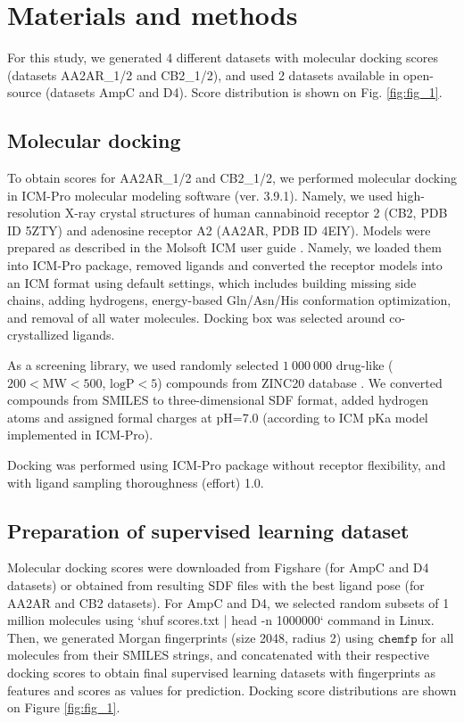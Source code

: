 \section{Materials and methods}
For this study, we generated 4 different datasets with molecular docking scores (datasets AA2AR\_1/2 and CB2\_1/2), and used 2 datasets available in open-source \cite{ultralarge_docking_first} (datasets AmpC and D4). Score distribution is shown on Fig. \ref{fig:fig_1}.

\subsection{Molecular docking}
To obtain scores for AA2AR\_1/2 and CB2\_1/2, we performed molecular docking in ICM-Pro molecular modeling software (ver. 3.9.1). Namely, we used high-resolution X-ray crystal structures of human cannabinoid receptor 2 (CB2, PDB ID 5ZTY) and adenosine receptor A2 (AA2AR, PDB ID 4EIY). Models were prepared as described in the Molsoft ICM user guide \cite{molsoft_guide}. Namely, we loaded them into ICM-Pro package, removed ligands and converted the receptor models into an ICM format using default settings, which includes building missing side chains, adding hydrogens, energy-based Gln/Asn/His conformation optimization, and removal of all water molecules. Docking box was selected around co-crystallized ligands.

As a screening library, we used randomly selected $1\ 000\ 000$ drug-like ($200 < \text{MW} < 500$, $\text{logP} < 5$) compounds from ZINC20 database \cite{Irwin2020ZINC20Discovery} . We converted compounds from SMILES to three-dimensional SDF  format, added hydrogen atoms and assigned formal charges at pH=7.0 (according to ICM pKa model implemented in ICM-Pro).

Docking was performed using ICM-Pro package without receptor flexibility, and with ligand sampling thoroughness (effort) 1.0.

\subsection{Preparation of supervised learning dataset}
Molecular docking scores were downloaded from Figshare (for AmpC and D4 datasets) or obtained from resulting SDF files with the best ligand pose (for AA2AR and CB2 datasets). For AmpC and D4, we selected random subsets of 1 million molecules using `shuf scores.txt | head -n 1000000` command in Linux. Then, we generated Morgan fingerprints (size 2048, radius 2) using $\texttt{chemfp}$ \cite{Dalke2019} for all molecules from their SMILES strings, and concatenated with their respective docking scores to obtain final supervised learning datasets with fingerprints as features and scores as values for prediction. Docking score distributions are shown on Figure \ref{fig:fig_1}.


